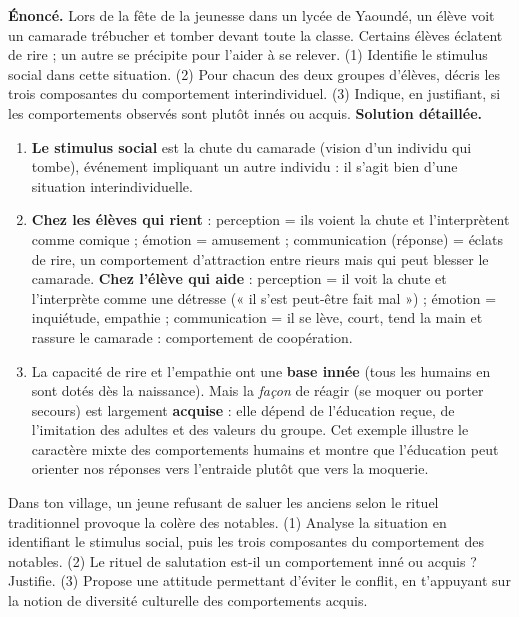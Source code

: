 \documentclass[11pt]{article}
\begin{document}
\begin{exoresolu}
\textbf{Énoncé.} Lors de la fête de la jeunesse dans un lycée de Yaoundé, un élève voit un camarade trébucher et tomber devant toute la classe. Certains élèves éclatent de rire ; un autre se précipite pour l'aider à se relever. (1) Identifie le stimulus social dans cette situation. (2) Pour chacun des deux groupes d'élèves, décris les trois composantes du comportement interindividuel. (3) Indique, en justifiant, si les comportements observés sont plutôt innés ou acquis.
\tcblower
\textbf{Solution détaillée.}
\begin{enumerate}
\item \textbf{Le stimulus social} est la chute du camarade (vision d'un individu qui tombe), événement impliquant un autre individu : il s'agit bien d'une situation interindividuelle.
\item \textbf{Chez les élèves qui rient} : perception = ils voient la chute et l'interprètent comme comique ; émotion = amusement ; communication (réponse) = éclats de rire, un comportement d'attraction entre rieurs mais qui peut blesser le camarade. \textbf{Chez l'élève qui aide} : perception = il voit la chute et l'interprète comme une détresse (« il s'est peut-être fait mal ») ; émotion = inquiétude, empathie ; communication = il se lève, court, tend la main et rassure le camarade : comportement de coopération.
\item La capacité de rire et l'empathie ont une \textbf{base innée} (tous les humains en sont dotés dès la naissance). Mais la \emph{façon} de réagir (se moquer ou porter secours) est largement \textbf{acquise} : elle dépend de l'éducation reçue, de l'imitation des adultes et des valeurs du groupe. Cet exemple illustre le caractère mixte des comportements humains et montre que l'éducation peut orienter nos réponses vers l'entraide plutôt que vers la moquerie.
\end{enumerate}
\end{exoresolu}

\begin{exercice}
Dans ton village, un jeune refusant de saluer les anciens selon le rituel traditionnel provoque la colère des notables. (1) Analyse la situation en identifiant le stimulus social, puis les trois composantes du comportement des notables. (2) Le rituel de salutation est-il un comportement inné ou acquis ? Justifie. (3) Propose une attitude permettant d'éviter le conflit, en t'appuyant sur la notion de diversité culturelle des comportements acquis.
\end{exercice}
\end{document}
